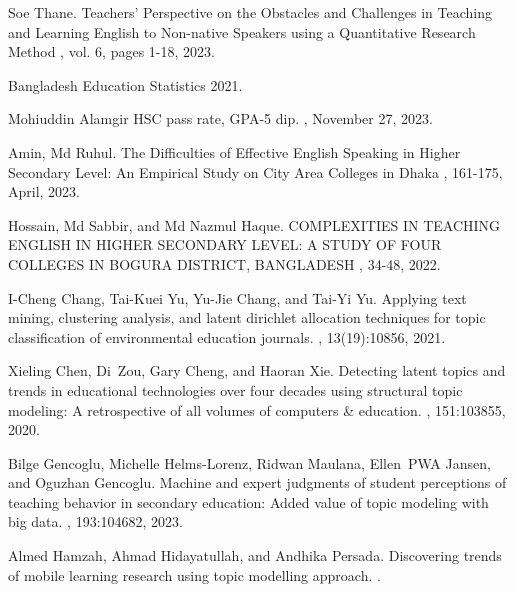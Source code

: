 \begin{thebibliography}{10}

Soe Thane.
\newblock Teachers' Perspective on the Obstacles and Challenges in Teaching and Learning English to Non-native Speakers using a Quantitative Research Method 
, vol. 6, pages 1-18, 2023.

Bangladesh {Education} {Statistics} 2021.


Mohiuddin Alamgir
\newblock HSC pass rate, GPA-5 dip.
, November 27, 2023.

Amin, Md Ruhul.
\newblock The Difficulties of Effective English Speaking in Higher Secondary Level: An Empirical Study on City Area Colleges in Dhaka 
, 161-175, April, 2023.

Hossain, Md Sabbir, and Md Nazmul Haque.
\newblock COMPLEXITIES IN TEACHING ENGLISH IN HIGHER SECONDARY LEVEL: A STUDY OF FOUR COLLEGES IN BOGURA DISTRICT, BANGLADESH
, 34-48, 2022.


I-Cheng Chang, Tai-Kuei Yu, Yu-Jie Chang, and Tai-Yi Yu.
\newblock Applying text mining, clustering analysis, and latent dirichlet
  allocation techniques for topic classification of environmental education
  journals.
, 13(19):10856, 2021.

Xieling Chen, Di~Zou, Gary Cheng, and Haoran Xie.
\newblock Detecting latent topics and trends in educational technologies over
  four decades using structural topic modeling: A retrospective of all volumes
  of computers \& education.
, 151:103855, 2020.

Bilge Gencoglu, Michelle Helms-Lorenz, Ridwan Maulana, Ellen~PWA Jansen, and
  Oguzhan Gencoglu.
\newblock Machine and expert judgments of student perceptions of teaching
  behavior in secondary education: Added value of topic modeling with big data.
, 193:104682, 2023.

Almed Hamzah, Ahmad Hidayatullah, and Andhika Persada.
\newblock Discovering trends of mobile learning research using topic modelling
  approach.
.


\end{thebibliography}
